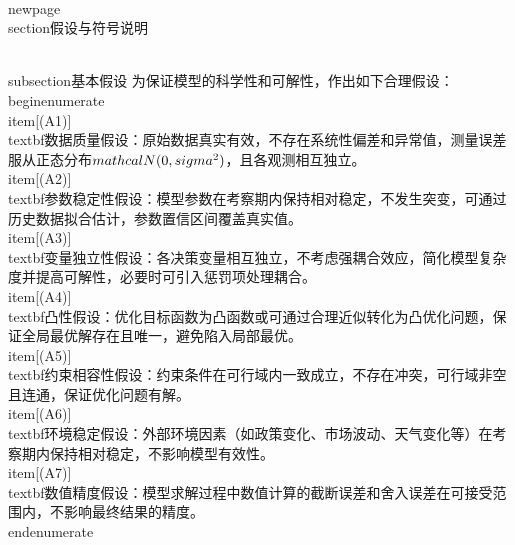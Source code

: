 \\newpage
\\section{假设与符号说明}

\\subsection{基本假设}
为保证模型的科学性和可解性，作出如下合理假设：
\\begin{enumerate}
    \\item[(A1)] \\textbf{数据质量假设}：原始数据真实有效，不存在系统性偏差和异常值，测量误差服从正态分布$\\mathcal{N}(0, \\sigma^2)$，且各观测相互独立。
    \\item[(A2)] \\textbf{参数稳定性假设}：模型参数在考察期内保持相对稳定，不发生突变，可通过历史数据拟合估计，参数置信区间覆盖真实值。
    \\item[(A3)] \\textbf{变量独立性假设}：各决策变量相互独立，不考虑强耦合效应，简化模型复杂度并提高可解性，必要时可引入惩罚项处理耦合。
    \\item[(A4)] \\textbf{凸性假设}：优化目标函数为凸函数或可通过合理近似转化为凸优化问题，保证全局最优解存在且唯一，避免陷入局部最优。
    \\item[(A5)] \\textbf{约束相容性假设}：约束条件在可行域内一致成立，不存在冲突，可行域非空且连通，保证优化问题有解。
    \\item[(A6)] \\textbf{环境稳定假设}：外部环境因素（如政策变化、市场波动、天气变化等）在考察期内保持相对稳定，不影响模型有效性。
    \\item[(A7)] \\textbf{数值精度假设}：模型求解过程中数值计算的截断误差和舍入误差在可接受范围内，不影响最终结果的精度。
\\end{enumerate}

